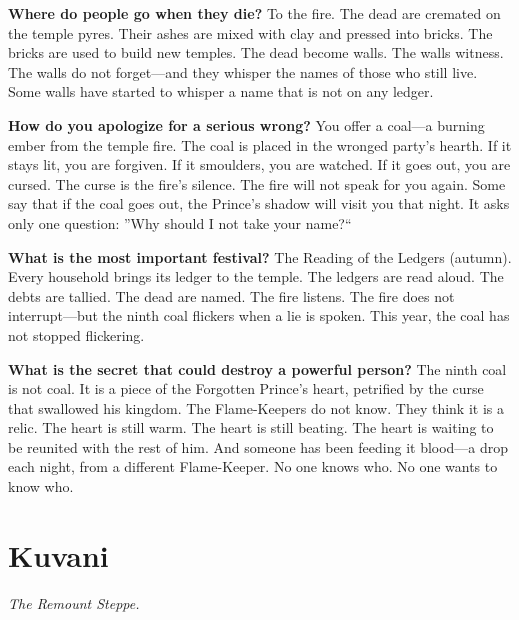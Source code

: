 \begin{almanac}
  \textbf{Where do people go when they die?} To the fire. The dead are cremated on the temple pyres. Their ashes are mixed with clay and pressed into bricks. The bricks are used to build new temples. The dead become walls. The walls witness. The walls do not forget---and they whisper the names of those who still live. Some walls have started to whisper a name that is not on any ledger.
  
  \textbf{How do you apologize for a serious wrong?} You offer a coal---a burning ember from the temple fire. The coal is placed in the wronged party's hearth. If it stays lit, you are forgiven. If it smoulders, you are watched. If it goes out, you are cursed. The curse is the fire's silence. The fire will not speak for you again. Some say that if the coal goes out, the Prince's shadow will visit you that night. It asks only one question: ''Why should I not take your name?``
  
  \textbf{What is the most important festival?} The Reading of the Ledgers (autumn). Every household brings its ledger to the temple. The ledgers are read aloud. The debts are tallied. The dead are named. The fire listens. The fire does not interrupt---but the ninth coal flickers when a lie is spoken. This year, the coal has not stopped flickering.
  
  \textbf{What is the secret that could destroy a powerful person?} The ninth coal is not coal. It is a piece of the Forgotten Prince's heart, petrified by the curse that swallowed his kingdom. The Flame-Keepers do not know. They think it is a relic. The heart is still warm. The heart is still beating. The heart is waiting to be reunited with the rest of him. And someone has been feeding it blood---a drop each night, from a different Flame-Keeper. No one knows who. No one wants to know who.
  \end{almanac}

\newpage

\newpage

\chapter{Kuvani}
\emph{The Remount Steppe.}

